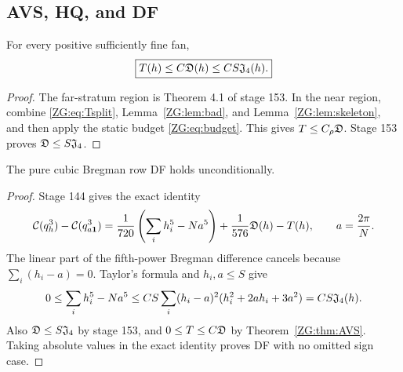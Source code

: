 \subsection{AVS, HQ, and DF}

\begin{theorem}
\label{ZG:thm:AVS}
For every
positive sufficiently fine fan,
\begin{equation}\label{ZG:eq:AVS}
 \boxed{
 T(h)\le C\mathfrak D(h)\le CS\mathfrak J_4(h).}
\end{equation}
\end{theorem}

\begin{proof}
The far-stratum region is Theorem 4.1 of stage 153.  In the near region,
combine \eqref{ZG:eq:Tsplit}, Lemma~\ref{ZG:lem:bad}, and
Lemma~\ref{ZG:lem:skeleton}, and then apply the static budget
\eqref{ZG:eq:budget}.  This gives $T\le C_\rho\mathfrak D$.  Stage 153 proves
$\mathfrak D\le S\mathfrak J_4$.
\end{proof}

\begin{corollary}\label{ZG:cor:DF}
The pure cubic Bregman row DF holds unconditionally.
\end{corollary}

\begin{proof}
Stage 144 gives the exact identity
\[
 \mathcal C(q_h^3)-\mathcal C(q_{a\mathbf1}^3)
 =\frac1{720}\left(\sum_i h_i^5-Na^5\right)
  +\frac1{576}\mathfrak D(h)-T(h),
 \qquad a=\frac{2\pi}{N}.
\]
The linear part of the fifth-power Bregman difference cancels because
$\sum_i(h_i-a)=0$.  Taylor's formula and $h_i,a\le S$ give
\[
 0\le\sum_i h_i^5-Na^5
 \le CS\sum_i(h_i-a)^2(h_i^2+2ah_i+3a^2)
 =CS\mathfrak J_4(h).
\]
Also $\mathfrak D\le S\mathfrak J_4$ by stage 153, and
$0\le T\le C\mathfrak D$ by Theorem~\ref{ZG:thm:AVS}.  Taking absolute values in
the exact identity proves DF with no omitted sign case.
\end{proof}
\endgroup
